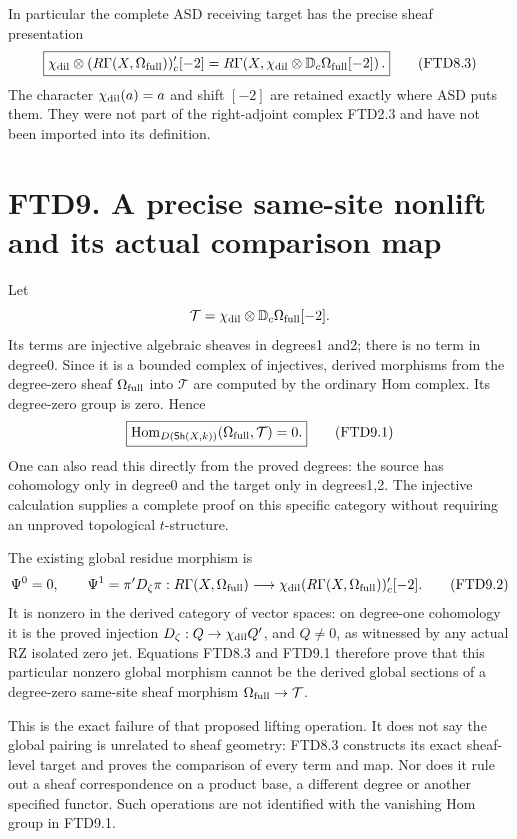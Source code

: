 In particular the complete ASD receiving target has the precise sheaf
presentation \[
\boxed{
\chi_{\rm dil}\otimes
(R\Gamma(X,\Omega_{\rm full}))'_c[-2]
=
R\Gamma\!\left(X,\chi_{\rm dil}\otimes
\mathbb D_c\Omega_{\rm full}[-2]\right).}
\tag{FTD8.3}
\] The character \(\chi_{\rm dil}(a)=a\) and shift \([-2]\) are retained
exactly where ASD puts them. They were not part of the right-adjoint
complex FTD2.3 and have not been imported into its definition.

\section{FTD9. A precise same-site nonlift and its actual comparison
map}\label{ftd9.-a-precise-same-site-nonlift-and-its-actual-comparison-map}

Let \[
\mathcal T=\chi_{\rm dil}\otimes\mathbb D_c\Omega_{\rm full}[-2].
\] Its terms are injective algebraic sheaves in degrees1 and2; there is
no term in degree0. Since it is a bounded complex of injectives, derived
morphisms from the degree-zero sheaf \(\Omega_{\rm full}\) into
\(\mathcal T\) are computed by the ordinary Hom complex. Its degree-zero
group is zero. Hence \[
\boxed{
\operatorname{Hom}_{D(\mathsf{Sh}(X,k))}
(\Omega_{\rm full},\mathcal T)=0.}
\tag{FTD9.1}
\] One can also read this directly from the proved degrees: the source
has cohomology only in degree0 and the target only in degrees1,2. The
injective calculation supplies a complete proof on this specific
category without requiring an unproved topological \(t\)-structure.

The existing global residue morphism is \[
\Psi^0=0,\qquad
\Psi^1=\pi'D_\zeta\pi:
R\Gamma(X,\Omega_{\rm full})
\longrightarrow
\chi_{\rm dil}(R\Gamma(X,\Omega_{\rm full}))'_c[-2].
\tag{FTD9.2}
\] It is nonzero in the derived category of vector spaces: on degree-one
cohomology it is the proved injection \(D_\zeta:Q\to\chi_{\rm dil}Q'\),
and \(Q\ne0\), as witnessed by any actual RZ isolated zero jet.
Equations FTD8.3 and FTD9.1 therefore prove that this particular nonzero
global morphism cannot be the derived global sections of a degree-zero
same-site sheaf morphism \(\Omega_{\rm full}\to\mathcal T\).

This is the exact failure of that proposed lifting operation. It does
not say the global pairing is unrelated to sheaf geometry: FTD8.3
constructs its exact sheaf-level target and proves the comparison of
every term and map. Nor does it rule out a sheaf correspondence on a
product base, a different degree or another specified functor. Such
operations are not identified with the vanishing Hom group in FTD9.1.

